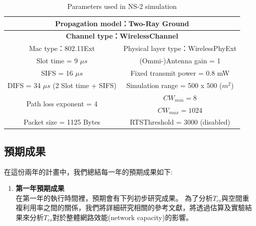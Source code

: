 \documentclass[12pt,a4paper]{article}
\newcommand{\Tab}[1]{表~\ref{#1}}
\begin{document}
\begin{description}
\begin{enumerate}
\begin{table}[!htb]
\centering
\caption{Parameters used in NS-2 simulation}
\vspace{0.2cm}
\small
\begin{tabular}{|c|c|}
\hline
\multicolumn{2}{|c|}{\bf{Propagation model：Two-Ray Ground}}\\
\hline
\multicolumn{2}{|c|}{\bf{Channel type：WirelessChannel}}\\
\hline
\hline
Mac type：802.11Ext & Physical layer type：WirelessPhyExt \\
\hline
Slot time = 9 $\mu s$ & (Ommi-)Antenna gain = 1 \\
\hline
SIFS = 16 $\mu s$ & Fixed transmit power = 0.8 mW \\
\hline
DIFS = 34 $\mu s$ (2 Slot time + SIFS) & Simulation range = 500 x 500 ($m^2$) \\
\hline
\multirow{2}{*}{Path loss exponent = 4} & $CW_{min} = 8$\\
                                  &$CW_{max} = 1024$\\
\hline
Packet size = 1125 Bytes & RTSThreshold = 3000 (disabled)\\
\hline
\end{tabular}
\label{tab:ns2-parameter}
\end{table}



\end{enumerate}


\subsection{預期成果}

在這份兩年的計畫中，我們總結每一年的預期成果如下: 

\begin{enumerate}
\setlength\parindent{2em}
\item [\textbullet]	{\textbf{\Kai 第一年預期成果}}\\

在第一年的執行時間裡，預期會有下列初步研究成果。
為了分析$T_{cs}$與空間重複利用率之間的關係，我們將詳細研究相關的參考文獻，將透過估算及實驗結果來分析$T_{cs}$對於整體網路效能(network capacity)的影響。


\end{enumerate}
\end{description}
\end{document}
